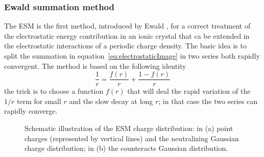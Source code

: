 \subsubsection{Ewald summation method} %
The \acf{ESM} is the first method, introduced by Ewald \etal
, for a correct treatment of the electrostatic energy contribution in an ionic crystal that ca be extended in the electrostatic interactions of a periodic charge density. The basic idea is to split the summation in equation~\eqref{eq:electrostaticImage} in two series both rapidly convergent. The method is based on the following identity
\begin{equation}
	\frac{1}{r} = \frac{f(r)}{r} + \frac{1 - f(r)}{r}
	\label{eq:ewaldTrick}
\end{equation}
the trick is to choose a function $f(r)$ that will deal the rapid variation of the $1/r$ term for small $r$ and the slow decay at long $r$; in that case the two series can rapidly converge.

\begin{figure}[!hb]
	\centering
	\qquad
	\caption{Schematic illustration of the \acl{ESM} charge distribution: in (a) point charges (represented by vertical lines) and the neutralizing Gaussian charge distribution; in (b) the counteracts Gaussian distribution.}
	\label{fig:ewald}
\end{figure}

